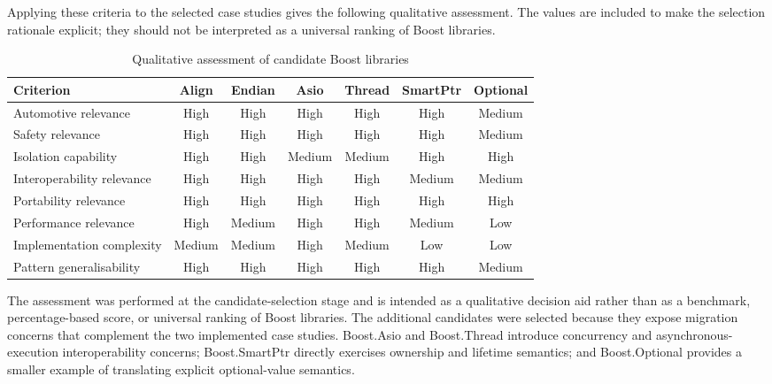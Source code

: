         Applying these criteria to the selected case studies gives the following qualitative assessment. The values are included to make the selection rationale explicit; they should not be interpreted as a universal ranking of Boost libraries.

        \begin{table}[H]
        \centering
        \renewcommand{\arraystretch}{1.2}
        \small
        \begin{tabular}{|l|c|c|c|c|c|c|}
        \hline
        \textbf{Criterion} & \textbf{Align} & \textbf{Endian} & \textbf{Asio} & \textbf{Thread} & \textbf{SmartPtr} & \textbf{Optional} \\ \hline
        Automotive relevance & High & High & High & High & High & Medium \\ \hline
        Safety relevance & High & High & High & High & High & Medium \\ \hline
        Isolation capability & High & High & Medium & Medium & High & High \\ \hline
        Interoperability relevance & High & High & High & High & Medium & Medium \\ \hline
        Portability relevance & High & High & High & High & High & High \\ \hline
        Performance relevance & High & Medium & High & High & Medium & Low \\ \hline
        Implementation complexity & Medium & Medium & High & Medium & Low & Low \\ \hline
        Pattern generalisability & High & High & High & High & High & Medium \\ \hline
        \end{tabular}
        \caption{Qualitative assessment of candidate Boost libraries}
        \label{tab:selected_library_assessment}
        \end{table}

        The assessment was performed at the candidate-selection stage and is intended as a
        qualitative decision aid rather than as a benchmark, percentage-based score, or universal
        ranking of Boost libraries. The additional candidates were selected because they expose
        migration concerns that complement the two implemented case studies. Boost.Asio and
        Boost.Thread introduce concurrency and asynchronous-execution interoperability concerns;
        Boost.SmartPtr directly exercises ownership and lifetime semantics; and Boost.Optional
        provides a smaller example of translating explicit optional-value semantics.

